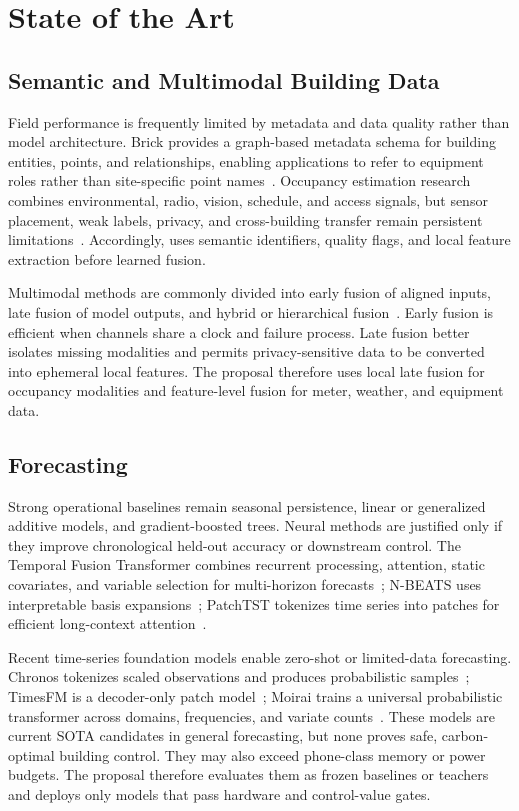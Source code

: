 \section{State of the Art}

\subsection{Semantic and Multimodal Building Data}

Field performance is frequently limited by metadata and data quality rather than model architecture. Brick provides a graph-based metadata schema for building entities, points, and relationships, enabling applications to refer to equipment roles rather than site-specific point names~\cite{balaji2016brick,balaji2018brick}. Occupancy estimation research combines environmental, radio, vision, schedule, and access signals, but sensor placement, weak labels, privacy, and cross-building transfer remain persistent limitations~\cite{chen2018occupancy}. Accordingly, \system{} uses semantic identifiers, quality flags, and local feature extraction before learned fusion.

Multimodal methods are commonly divided into early fusion of aligned inputs, late fusion of model outputs, and hybrid or hierarchical fusion~\cite{baltrusaitis2018multimodal}. Early fusion is efficient when channels share a clock and failure process. Late fusion better isolates missing modalities and permits privacy-sensitive data to be converted into ephemeral local features. The proposal therefore uses local late fusion for occupancy modalities and feature-level fusion for meter, weather, and equipment data.

\subsection{Forecasting}

Strong operational baselines remain seasonal persistence, linear or generalized additive models, and gradient-boosted trees. Neural methods are justified only if they improve chronological held-out accuracy or downstream control. The Temporal Fusion Transformer combines recurrent processing, attention, static covariates, and variable selection for multi-horizon forecasts~\cite{lim2021tft}; N-BEATS uses interpretable basis expansions~\cite{oreshkin2020nbeats}; PatchTST tokenizes time series into patches for efficient long-context attention~\cite{nie2023patchtst}.

Recent time-series foundation models enable zero-shot or limited-data forecasting. Chronos tokenizes scaled observations and produces probabilistic samples~\cite{ansari2024chronos}; TimesFM is a decoder-only patch model~\cite{das2024timesfm}; Moirai trains a universal probabilistic transformer across domains, frequencies, and variate counts~\cite{woo2024moirai}. These models are current SOTA candidates in general forecasting, but none proves safe, carbon-optimal building control. They may also exceed phone-class memory or power budgets. The proposal therefore evaluates them as frozen baselines or teachers and deploys only models that pass hardware and control-value gates.

